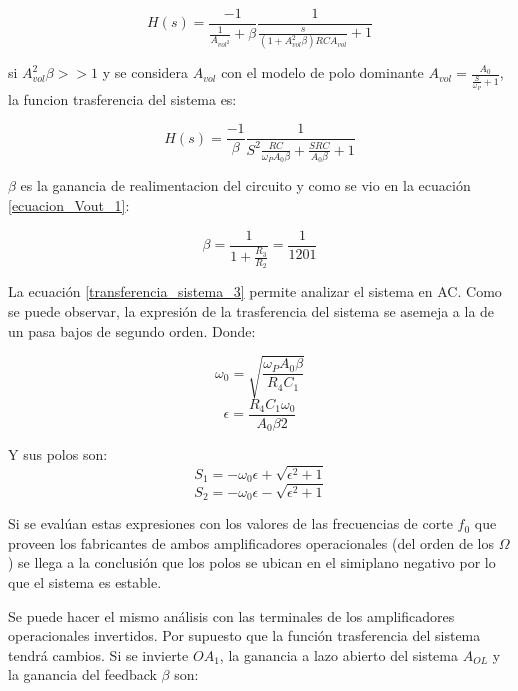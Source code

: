 \begin{equation} H (s) = \frac{-1}{\frac{1}{A_{vol^2}}+\beta}\frac{1}{\frac{s}{(1+A_{vol}^2\beta)RC A_{vol}}+1} \label{transferencia_sistema_2}  \end{equation}

si $A_{vol}^2 \beta >> 1 $  y se considera $A_{vol}$ con el modelo de polo dominante $A_{vol} = \frac{A_0}{\frac{S}{\omega_P}+1}$, la funcion trasferencia del sistema es:

\begin{equation} H (s) = \frac{-1}{\beta} \frac{1}{S^2\frac{RC}{\omega_P A_0 \beta} + \frac{S R C}{A_0 \beta} +1 } \label{transferencia_sistema_3}  \end{equation}

$\beta$ es la ganancia de realimentacion del circuito y como se vio en la ecuación \ref{ecuacion_Vout_1}:

\begin{equation} \beta =  \frac{1}{1+ \frac{R_3}{R_2}} = \frac{1}{1201} \label{beta}  \end{equation}

La ecuación \ref{transferencia_sistema_3} permite analizar el sistema en AC. Como se puede observar, la expresión de la trasferencia del sistema se asemeja a la de un pasa bajos de segundo orden. Donde:


\begin{displaymath} \omega_0 = \sqrt{\frac{\omega_P A_{0} \beta}{R_4 C_1}} \end{displaymath}
\begin{displaymath} \epsilon = \frac{R_4 C_1 \omega_0}{A_0 \beta 2} \end{displaymath}

Y sus polos son:
\begin{displaymath} S_1 = -\omega_0 \epsilon + \sqrt{\epsilon^2 + 1} \end{displaymath}
\begin{displaymath} S_2 = -\omega_0 \epsilon - \sqrt{\epsilon^2 + 1} \end{displaymath}

Si se evalúan estas expresiones con los valores de las frecuencias de corte $f_0$ que proveen los fabricantes de ambos amplificadores operacionales (del orden de los $\Omega$ ) se llega a la conclusión que los polos 
se ubican en el simiplano negativo por lo que el sistema es estable. 

Se puede hacer el mismo análisis con las terminales de los amplificadores operacionales invertidos. Por supuesto que la función trasferencia del sistema tendrá cambios. Si se invierte $OA_1$, la ganancia a lazo abierto del sistema $A_{OL}$ y la ganancia del feedback $\beta$ son:

